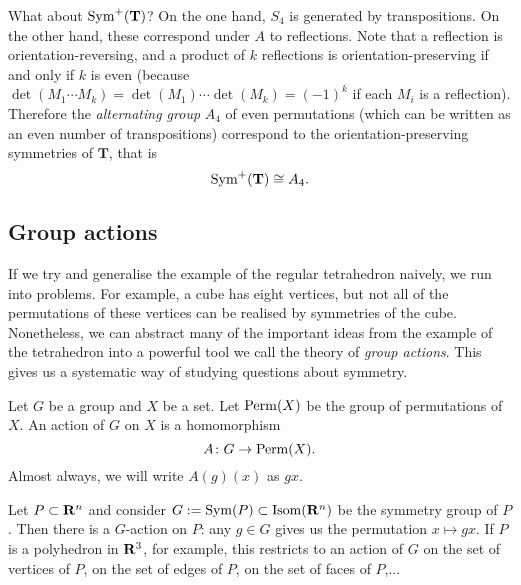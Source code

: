 \documentclass[12pt]{article}
\begin{document}
What about $\operatorname{Sym}^+(\mathbf{T})$? On the one hand, $S_4$ is generated by transpositions. On the other hand, these correspond under $A$ to reflections. Note that a reflection is orientation-reversing, and a product of $k$ reflections is orientation-preserving if and only if $k$ is even (because $\det(M_1\cdots M_k)=\det(M_1)\cdots\det(M_k)=(-1)^k$ if each $M_i$ is a reflection). Therefore the {\em alternating group} $A_4$ of even permutations (which can be written as an even number of transpositions) correspond to the orientation-preserving symmetries of $\mathbf{T}$, that is
\[\operatorname{Sym}^+(\mathbf{T})\cong A_4.\]

\subsection{Group actions}

If we try and generalise the example of the regular tetrahedron naively, we run into problems. For example, a cube has eight vertices, but not all of the permutations of these vertices can be realised by symmetries of the cube. Nonetheless, we can abstract many of the important ideas from the example of the tetrahedron into a powerful tool we call the theory of {\em group actions}. This gives us a systematic way of studying questions about symmetry.

\begin{dfn}
  Let $G$ be a group and $X$ be a set. Let $\operatorname{Perm}(X)$ be the group of permutations of $X$. An action of $G$ on $X$ is a homomorphism
  \[A\colon G\to\operatorname{Perm}(X).\]
  Almost always, we will write $A(g)(x)$ as $gx$.
\end{dfn}

\begin{exm}
  Let $P\subset\mathbf{R}^n$ and consider $G:=\operatorname{Sym}(P)\subset\operatorname{Isom}(\mathbf{R}^n)$ be the symmetry group of $P$. Then there is a $G$-action on $P$: any $g\in G$ gives us the permutation $x\mapsto gx$. If $P$ is a polyhedron in $\mathbf{R}^3$, for example, this restricts to an action of $G$ on the set of vertices of $P$, on the set of edges of $P$, on the set of faces of $P$,...
\end{exm}
\end{document}
